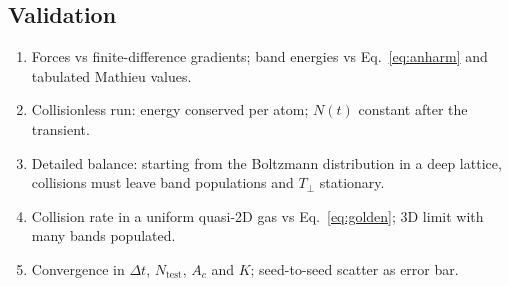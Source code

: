 \documentclass[11pt,a4paper]{article}
\begin{document}
\subsection{Validation}
\begin{enumerate}[leftmargin=*]
\item Forces vs finite-difference gradients; band energies vs Eq.~\eqref{eq:anharm} and tabulated Mathieu values.
\item Collisionless run: energy conserved per atom; $N(t)$ constant after the transient.
\item Detailed balance: starting from the Boltzmann distribution in a deep lattice, collisions must leave band populations and $T_\perp$ stationary.
\item Collision rate in a uniform quasi-2D gas vs Eq.~\eqref{eq:golden}; 3D limit with many bands populated.
\item Convergence in $\Delta t$, $N_\mathrm{test}$, $A_c$ and $K$; seed-to-seed scatter as error bar.
\end{enumerate}
\end{document}
